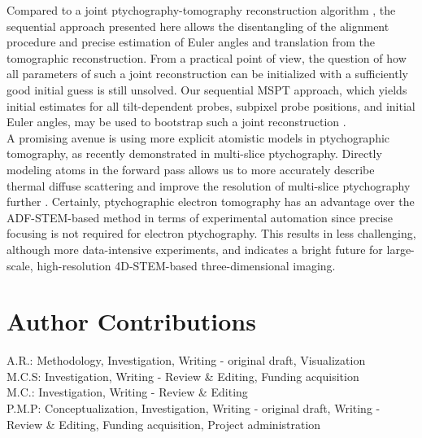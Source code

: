 \documentclass[12pt]{iopart}
\begin{document}
Compared to a joint ptychography-tomography reconstruction algorithm \cite{Lee_Lee_Park_Ophus_Yang_2023}, the sequential approach presented here allows the disentangling of the alignment procedure and precise estimation of Euler angles and translation from the tomographic reconstruction. From a practical point of view, the question of how all parameters of such a joint reconstruction can be initialized with a sufficiently good initial guess is still unsolved. Our sequential MSPT approach, which yields initial estimates for all tilt-dependent probes, subpixel probe positions, and initial Euler angles, may be used to bootstrap such a joint reconstruction \cite{you2024near}.\\
A promising avenue is using more explicit atomistic models in ptychographic tomography, as recently demonstrated in multi-slice ptychography. Directly modeling atoms in the forward pass allows us to more accurately describe thermal diffuse scattering \cite{Diederichs_2024} and improve the resolution of multi-slice ptychography further \cite{Yang_Sha_Cui_Mao_Yu_2024}.
Certainly, ptychographic electron tomography has an advantage over the ADF-STEM-based method in terms of experimental automation since precise focusing is not required for electron ptychography. This results in less challenging, although more data-intensive experiments, and indicates a bright future for large-scale, high-resolution 4D-STEM-based three-dimensional imaging.

\section{Author Contributions}
A.R.: Methodology, Investigation, Writing - original draft, Visualization\\
M.C.S: Investigation, Writing - Review \& Editing, Funding acquisition\\
M.C.: Investigation, Writing - Review \& Editing\\
P.M.P: Conceptualization, Investigation, Writing - original draft, Writing - Review \& Editing, Funding acquisition, Project administration\\
\end{document}
